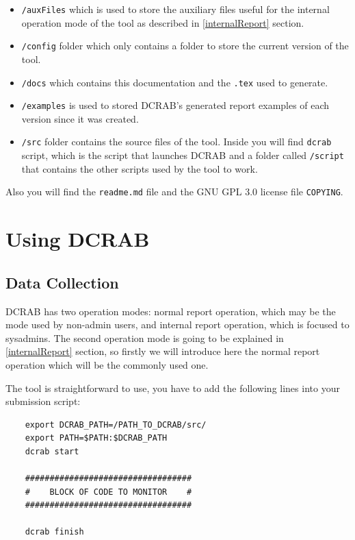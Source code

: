 \documentclass[10pt,a4paper]{report}
\begin{document}
\begin{itemize}
  \item \verb+/auxFiles+ which is used to store the auxiliary files useful for the internal operation mode of the tool as described in \ref{internalReport} section.
  \item \verb+/config+ folder which only contains a folder to store the current version of the tool.
  \item \verb+/docs+ which contains this documentation and the \verb+.tex+ used to generate.
  \item \verb+/examples+ is used to stored DCRAB's generated report examples of each version since it was created.
  \item \verb+/src+ folder contains the source files of the tool. Inside you will find \verb+dcrab+ script, which is the script that launches DCRAB and a folder called \verb+/script+ that contains the other scripts used by the tool to work.
\end{itemize}

Also you will find the \verb+readme.md+ file and the GNU GPL 3.0 license file \verb+COPYING+.

\chapter{Using DCRAB}

\section{Data Collection}
\label{dataCollection}
DCRAB has two operation modes: normal report operation, which may be the mode used by non-admin users, and internal report operation, which is focused to sysadmins. The second operation mode is going to be explained in \ref{internalReport} section, so firstly we will introduce here the normal report operation which will be the commonly used one.

The tool is straightforward to use, you have to add the following lines into your submission script:

\begin{verbatim}
    export DCRAB_PATH=/PATH_TO_DCRAB/src/
    export PATH=$PATH:$DCRAB_PATH
    dcrab start

    ##################################
    #    BLOCK OF CODE TO MONITOR    #
    ##################################

    dcrab finish
\end{verbatim}
\end{document}
